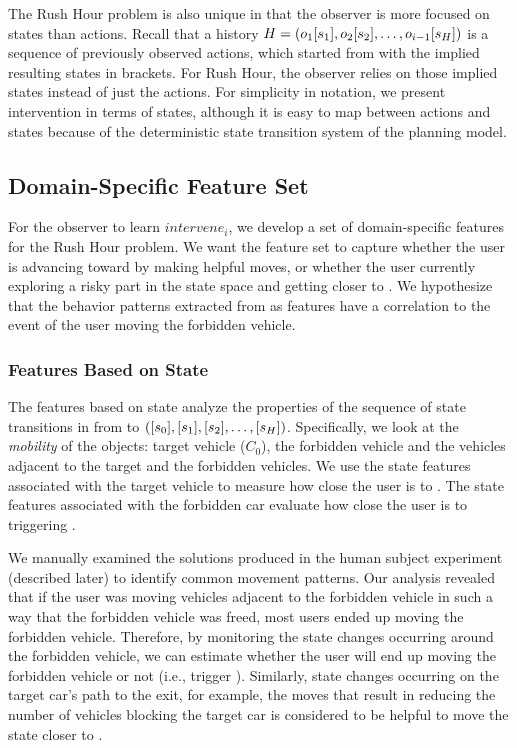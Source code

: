 The Rush Hour problem is also unique in that the observer is more focused on states than actions.
Recall that a history  $H = ( o_1 [s_1], o_2 [s_2], \ldots, o_{i-1} [s_{H}])$  is a sequence of previously observed actions, which started from \initialState with the implied resulting states in brackets.
For Rush Hour, the observer relies on those implied states instead of just the actions.
For simplicity in notation, we present intervention in terms of states, although it is easy to map between actions and states because of the deterministic state transition system of the planning model.


\subsection{Domain-Specific Feature Set}
For the observer to learn $intervene_i$, we develop a set of domain-specific features for the Rush Hour problem.
We want the feature set to capture whether the user is advancing toward \desired by making helpful moves, or whether the user currently exploring a risky part in the state space and getting closer to \undesired.
We hypothesize that the behavior patterns extracted from \historyDef as features have a correlation to the event of the user moving the forbidden vehicle. 

\subsubsection{Features Based on State}
The features based on state analyze the properties of the sequence of state transitions in \historyDef from \initialState to \historyEndState $( [s_0], [s_1], [s_2], \ldots, [s_{H}])$.
Specifically, we look at the \textit{mobility} of the objects: target vehicle ($C_0$), the forbidden vehicle and the vehicles adjacent to the target and the forbidden vehicles.
We use the state features associated with the target vehicle to measure how close the user is to \desired. 
The state features associated with the forbidden car evaluate how close the user is to triggering \undesired. 

We manually examined the solutions produced in the human subject experiment (described later) to identify common movement patterns. 
Our analysis revealed that if the user was moving vehicles adjacent to the forbidden vehicle in such a way that the forbidden vehicle was freed, most users ended up moving the forbidden vehicle. 
Therefore, by monitoring the state changes occurring around the forbidden vehicle, we can estimate whether the user will end up moving the forbidden vehicle or not (i.e., trigger \undesired). 
Similarly, state changes occurring on the target car’s path to the exit, for example, the moves that result in reducing the number of vehicles blocking the target car is considered to be helpful to move the state closer to \desired.


